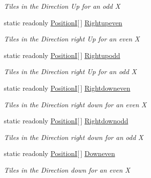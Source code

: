 \begin{DoxyCompactItemize}
\begin{DoxyCompactList}\small\item\em Tiles in the Direction Up for an odd X \end{DoxyCompactList}\item 
static readonly \hyperlink{classCore_1_1Models_1_1PositionI}{Position\+I}\mbox{[}$\,$\mbox{]} \hyperlink{classClient_1_1Common_1_1Views_1_1MenuView_a36b0ad902b98487477a87442d088d747}{Rightupeven}
\begin{DoxyCompactList}\small\item\em Tiles in the Direction right Up for an even X \end{DoxyCompactList}\item 
static readonly \hyperlink{classCore_1_1Models_1_1PositionI}{Position\+I}\mbox{[}$\,$\mbox{]} \hyperlink{classClient_1_1Common_1_1Views_1_1MenuView_a4e6fa7548be9f1c327bb97a5447721ff}{Rightupodd}
\begin{DoxyCompactList}\small\item\em Tiles in the Direction right Up for an odd X \end{DoxyCompactList}\item 
static readonly \hyperlink{classCore_1_1Models_1_1PositionI}{Position\+I}\mbox{[}$\,$\mbox{]} \hyperlink{classClient_1_1Common_1_1Views_1_1MenuView_ae711e0210073a31a2bf15ad1d77e8478}{Rightdowneven}
\begin{DoxyCompactList}\small\item\em Tiles in the Direction right down for an even X \end{DoxyCompactList}\item 
static readonly \hyperlink{classCore_1_1Models_1_1PositionI}{Position\+I}\mbox{[}$\,$\mbox{]} \hyperlink{classClient_1_1Common_1_1Views_1_1MenuView_ab2619bc7970cbbdaeba9521561eabe53}{Rightdownodd}
\begin{DoxyCompactList}\small\item\em Tiles in the Direction right down for an odd X \end{DoxyCompactList}\item 
static readonly \hyperlink{classCore_1_1Models_1_1PositionI}{Position\+I}\mbox{[}$\,$\mbox{]} \hyperlink{classClient_1_1Common_1_1Views_1_1MenuView_a3c8065c208ad29887f55bb7b7e8f2868}{Downeven}
\begin{DoxyCompactList}\small\item\em Tiles in the Direction down for an even X \end{DoxyCompactList}\item 

\end{DoxyCompactItemize}
